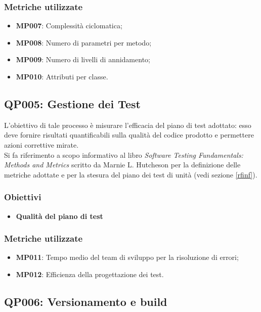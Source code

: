 \subsubsection{Metriche utilizzate}

\begin{itemize}
	\item \textbf{MP007}: Complessità ciclomatica;
	\item \textbf{MP008}: Numero di parametri per metodo;
	\item \textbf{MP009}: Numero di livelli di annidamento;
	\item \textbf{MP010}: Attributi per classe.
	
	
\end{itemize}

\subsection{QP005: Gestione dei Test}\label{test}
L'obiettivo di tale processo è misurare l'efficacia del piano di test adottato: esso deve fornire risultati quantificabili sulla qualità del codice prodotto e permettere azioni correttive mirate.\\
Si fa riferimento a scopo informativo al libro \textit{Software Testing Fundamentals: Methods and Metrics} scritto da Marnie L. Hutcheson per la definizione delle metriche adottate e per la stesura del piano dei test di unità (vedi sezione \ref{rfinf}).
\subsubsection{Obiettivi}
\begin{itemize}
	\item \textbf{Qualità del piano di test} 
\end{itemize}
\subsubsection{Metriche utilizzate}
\begin{itemize}
	\item \textbf{MP011}: Tempo medio del team di sviluppo per la risoluzione di errori;
	\item \textbf{MP012}: Efficienza della progettazione dei test.
\end{itemize}


\subsection{QP006: Versionamento e build}
